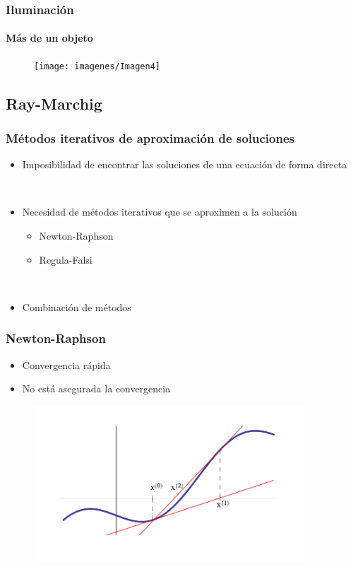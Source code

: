 \documentclass{beamer}
\begin{document}
	\begin{frame}
		\frametitle{Iluminación}
		\framesubtitle{Más de un objeto}
		
		\begin{figure}[h]
			\texttt{[image: imagenes/Imagen4]}
		\end{figure}
		
	\end{frame}
	
	\subsection{Ray-Marchig}
	
	\begin{frame}
		\frametitle{Métodos iterativos de aproximación de soluciones}
		
		\begin{itemize}
			\item Imposibilidad de encontrar las soluciones de una ecuación de forma directa
			
			${ }$\\
			
			\item Necesidad de métodos iterativos que se aproximen a la solución
			\begin{itemize}
				\item Newton-Raphson
				\item Regula-Falsi
			\end{itemize}
			
			${ }$\\
			
			\item Combinación de métodos
		\end{itemize}
	\end{frame}
	
	\begin{frame}
		\frametitle{Newton-Raphson}
		
		\begin{itemize}
			\item Convergencia rápida
			\item No está asegurada la convergencia
		\end{itemize}
		
		\begin{figure}[h]
			\begin{center}
				\includegraphics[width=0.9\textwidth]{imagenes/newton.png}
			\end{center}
		\end{figure}
	\end{frame}
	
\end{document}
